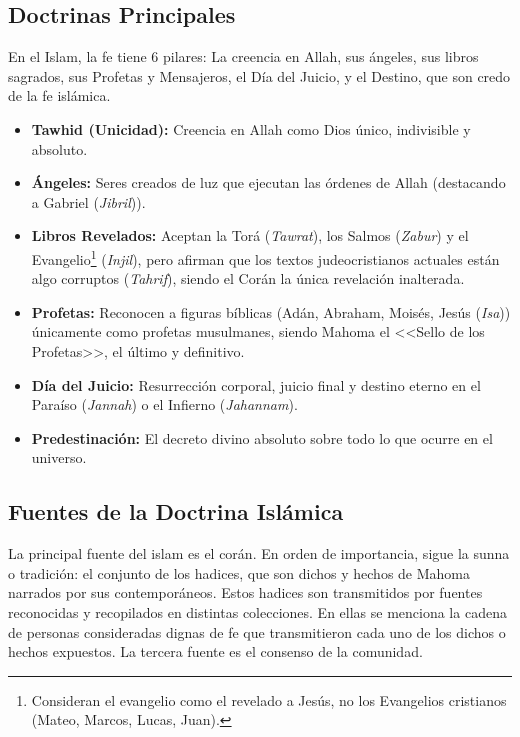 \documentclass[12pt]{report}
\begin{document}
	\subsection{Doctrinas Principales}
	En el Islam, la fe tiene 6 pilares: La creencia en Allah, sus ángeles, sus libros sagrados, sus Profetas y Mensajeros, el Día del Juicio, y el Destino, que son credo de la fe islámica.
	\begin{itemize}
		\item \textbf{Tawhid (Unicidad):} Creencia en Allah como Dios único, indivisible y absoluto.
		\item \textbf{Ángeles:} Seres creados de luz que ejecutan las órdenes de Allah (destacando a Gabriel (\textit{Jibril})).
		\item \textbf{Libros Revelados:} Aceptan la Torá (\textit{Tawrat}), los Salmos (\textit{Zabur}) y el Evangelio\footnote{Consideran el evangelio como el revelado a Jesús, no los Evangelios cristianos (Mateo, Marcos, Lucas, Juan).} (\textit{Injil}), pero afirman que los textos judeocristianos actuales están algo corruptos (\textit{Tahrif}), siendo el Corán la única revelación inalterada.
		\item \textbf{Profetas:} Reconocen a figuras bíblicas (Adán, Abraham, Moisés, Jesús (\textit{Isa})) únicamente como profetas musulmanes, siendo Mahoma el <<Sello de los Profetas>>, el último y definitivo.
		\item \textbf{Día del Juicio:} Resurrección corporal, juicio final y destino eterno en el Paraíso (\textit{Jannah}) o el Infierno (\textit{Jahannam}).
		\item \textbf{Predestinación:} El decreto divino absoluto sobre todo lo que ocurre en el universo.
	\end{itemize}
	
	
	\subsection{Fuentes de la Doctrina Islámica}
	La principal fuente del islam es el corán. En orden de importancia, sigue la sunna o tradición: el conjunto de los hadices, que son dichos y hechos de Mahoma narrados por sus contemporáneos. Estos hadices son transmitidos por fuentes reconocidas y recopilados en distintas colecciones. En ellas se menciona la cadena de personas consideradas dignas de fe que transmitieron cada uno de los dichos o hechos expuestos. La tercera fuente es el consenso de la comunidad.
	
\end{document}
